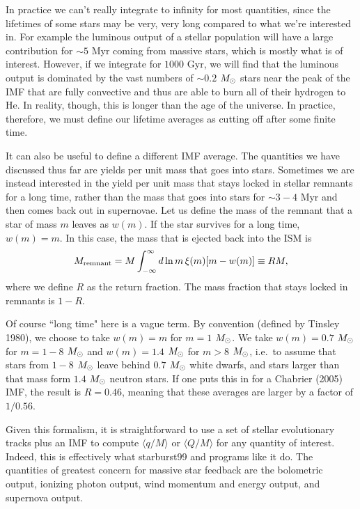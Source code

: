 In practice we can't really integrate to infinity for most quantities, since the lifetimes of some stars may be very, very long compared to what we're interested in. For example the luminous output of a stellar population will have a large contribution for $\sim 5$ Myr coming from massive stars, which is mostly what is of interest. However, if we integrate for $1000$ Gyr, we will find that the luminous output is dominated by the vast numbers of $\sim 0.2$ $M_{\odot}$ stars near the peak of the IMF that are fully convective and thus are able to burn all of their hydrogen to He. In reality, though, this is longer than the age of the universe. In practice, therefore, we must define our lifetime averages as cutting off after some finite time.

It can also be useful to define a different IMF average. The quantities we have discussed thus far are yields per unit mass that goes into stars. Sometimes we are instead interested in the yield per unit mass that stays locked in stellar remnants for a long time, rather than the mass that goes into stars for $\sim 3-4$ Myr and then comes back out in supernovae. Let us define the mass of the remnant that a star of mass $m$ leaves as $w(m)$. If the star survives for a long time, $w(m) = m$. In this case, the mass that is ejected back into the ISM is
\begin{equation}
M_{\rm remnant} = M \int_{-\infty}^{\infty} d\ln m \, \xi(m) [m - w(m)] \equiv R M,
\end{equation}
where we define $R$ as the return fraction. The mass fraction that stays locked in remnants is $1-R$.

Of course ``long time" here is a vague term. By convention (defined by Tinsley 1980), we choose to take $w(m) = m$ for $m=1$ $M_{\odot}$. We take $w(m) = 0.7$ $M_{\odot}$ for $m=1-8$ $M_{\odot}$ and $w(m) = 1.4$ $M_{\odot}$ for $m>8$ $M_{\odot}$, i.e.\ to assume that stars from $1-8$ $M_{\odot}$ leave behind $0.7$ $M_{\odot}$ white dwarfs, and stars larger than that mass form $1.4$ $M_{\odot}$ neutron stars. If one puts this in for a Chabrier (2005) IMF, the result is $R=0.46$, meaning that these averages are larger by a factor of $1/0.56$.

Given this formalism, it is straightforward to use a set of stellar evolutionary tracks plus an IMF to compute $\langle q/M\rangle$ or $\langle Q/M\rangle$ for any quantity of interest. Indeed, this is effectively what starburst99 and programs like it do. The quantities of greatest concern for massive star feedback are the bolometric output, ionizing photon output, wind momentum and energy output, and supernova output.

